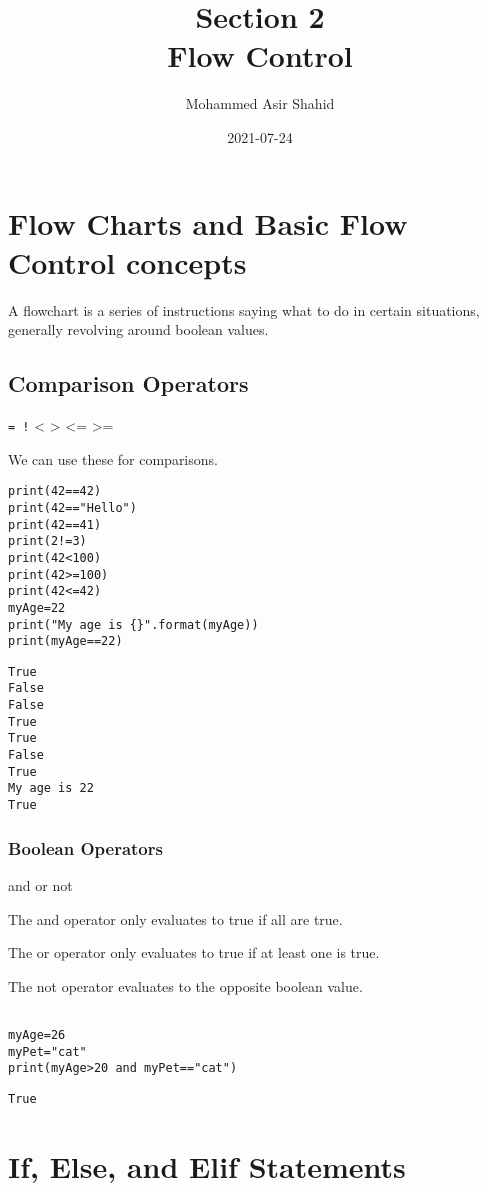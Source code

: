 \documentclass[11pt]{article}
\author{Mohammed Asir Shahid}
\date{2021-07-24}
\title{Section 2\\\medskip
\large Flow Control}
\begin{document}
\maketitle
\tableofcontents


\section{Flow Charts and Basic Flow Control concepts}
\label{sec:orge3dd990}

A flowchart is a series of instructions saying what to do in certain situations, generally revolving around boolean values.

\subsection{Comparison Operators}
\label{sec:orgfe970c7}
\texttt{=
!}
<
>
<=
>=

We can use these for comparisons.

\begin{verbatim}
print(42==42)
print(42=="Hello")
print(42==41)
print(2!=3)
print(42<100)
print(42>=100)
print(42<=42)
myAge=22
print("My age is {}".format(myAge))
print(myAge==22)
\end{verbatim}

\begin{verbatim}
True
False
False
True
True
False
True
My age is 22
True
\end{verbatim}

\subsubsection{Boolean Operators}
\label{sec:org1ae3191}
and
or
not

The and operator only evaluates to true if all are true.

The or operator only evaluates to true if at least one is true.

The not operator evaluates to the opposite boolean value.

\begin{verbatim}

myAge=26
myPet="cat"
print(myAge>20 and myPet=="cat")

\end{verbatim}

\begin{verbatim}
True
\end{verbatim}

\section{If, Else, and Elif Statements}
\label{sec:orgb357bb3}
\end{document}

